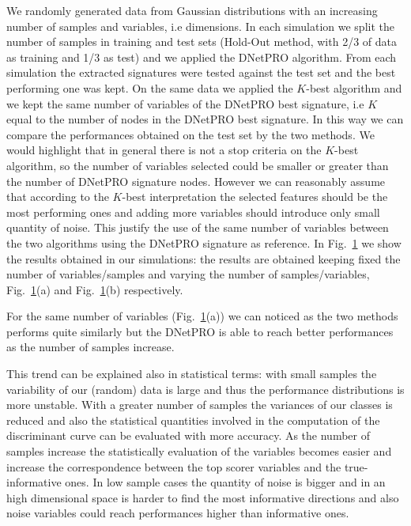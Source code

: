 \documentclass{standalone}
\begin{document}
We randomly generated data from Gaussian distributions with an increasing number of samples and variables, i.e dimensions.
In each simulation we split the number of samples in training and test sets (Hold-Out method, with 2/3 of data as training and 1/3 as test) and we applied the DNetPRO algorithm.
From each simulation the extracted signatures were tested against the test set and the best performing one was kept.
On the same data we applied the $K$-best algorithm and we kept the same number of variables of the DNetPRO best signature, i.e $K$ equal to the number of nodes in the DNetPRO best signature.
In this way we can compare the performances obtained on the test set by the two methods.
We would highlight that in general there is not a stop criteria on the $K$-best algorithm, so the number of variables selected could be smaller or greater than the number of DNetPRO signature nodes.
However we can reasonably assume that according to the $K$-best interpretation the selected features should be the most performing ones and adding more variables should introduce only small quantity of noise.
This justify the use of the same number of variables between the two algorithms using the DNetPRO signature as reference.
In Fig.~\ref{fig:dnetpro_toy} we show the results obtained in our simulations: the results are obtained keeping fixed the number of variables/samples and varying the number of samples/variables, Fig.~\ref{fig:dnetpro_toy}(a) and Fig.~\ref{fig:dnetpro_toy}(b) respectively.

\begin{figure}[htbp]
\centering
\def\svgwidth{0.45\textwidth}

\qquad\qquad
\centering
\def\svgwidth{0.45\textwidth}

\caption{
}
\label{fig:dnetpro_toy}
\end{figure}

For the same number of variables (Fig.~\ref{fig:dnetpro_toy}(a)) we can noticed as the two methods performs quite similarly but the DNetPRO is able to reach better performances as the number of samples increase.

This trend can be explained also in statistical terms: with small samples the variability of our (random) data is large and thus the performance distributions is more unstable.
With a greater number of samples the variances of our classes is reduced and also the statistical quantities involved in the computation of the discriminant curve can be evaluated with more accuracy.
As the number of samples increase the statistically evaluation of the variables becomes easier and increase the correspondence between the top scorer variables and the true-informative ones.
In low sample cases the quantity of noise is bigger and in an high dimensional space is harder to find the most informative directions and also noise variables could reach performances higher than informative ones.
\end{document}
